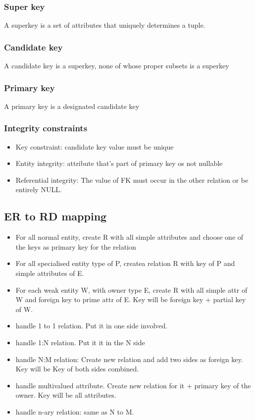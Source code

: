 \documentclass[a4paper]{scrartcl}
\begin{document}
    \subsubsection{Super key}
      A superkey is a set of attributes that uniquely determines a tuple.
    \subsubsection{Candidate key}
      A candidate key is a superkey, none of whose proper subsets is a superkey
    \subsubsection{Primary key}
      A primary key is a designated candidate key
    \subsubsection{Integrity constraints}
      \begin{itemize}
        \item Key constraint: candidate key value must be unique
        \item Entity integrity: attribute that's part of primary key os not nullable
        \item Referential integrity: The value of FK must occur in the other relation or be entirely
NULL.
      \end{itemize}
  \subsection{ER to RD mapping}
    \begin{itemize}
      \item For all normal entity, create R with all simple attributes and choose one of the keys as primary key for the relation
      \item For all specialised entity type of P, createa relation R with key of P and simple attributes of E.
      \item For each weak entity W, with owner type E, create R with all simple attr of W and foreign key to prime attr of E. Key will be foreign key + partial key of W.
      \item handle 1 to 1 relation. Put it in one side involved.
      \item handle 1:N relation. Put it it in the N side
      \item handle N:M relation: Create new relation and add two sides as foreign key. Key will be Key of both sides combined.
      \item handle multivalued attribute. Create new relation for it + primary key of the owner. Key will be all attributes.
      \item handle n-ary relation: same as N to M.
    \end{itemize}
\end{document}
